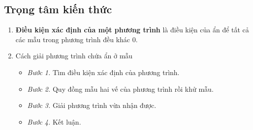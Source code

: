 {\subsection{Trọng tâm kiến thức}
\begin{enumerate}[1)]
	\item \textbf{Điều kiện xác định của một phương trình} là điều kiện của ẩn để tất cả các mẫu trong phương trình đều khác $0$.
	\item Cách giải phương trình chứa ẩn ở mẫu
	\begin{itemize}
		\item \textit{Bước 1.} Tìm điều kiện xác định của phương trình.
		\item \textit{Bước 2.} Quy đồng mẫu hai vế của phương trình rồi khử mẫu.
		\item \textit{Bước 3.} Giải phương trình vừa nhận được.
		\item \textit{Bước 4.} Kết luận.
	\end{itemize}
\end{enumerate}
}
